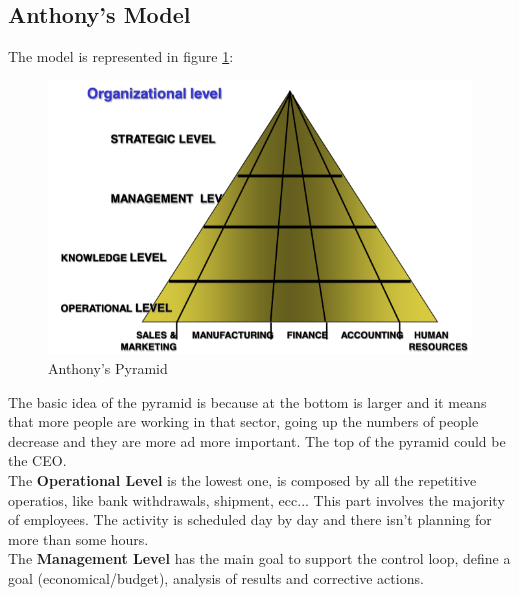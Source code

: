 \documentclass[12pt]{article}
\begin{document}
\subsection{Anthony's Model}
The model is represented in figure \ref{fig:anthony}:
\begin{figure}[H]
  \includegraphics[width=\linewidth]{images/anthony.png}
  \caption{Anthony's Pyramid}
  \label{fig:anthony}
\end{figure}
The basic idea of the pyramid is because at the bottom is larger and it means that more people are working in that sector, going up the numbers of people decrease and they are more ad more important. The top of the pyramid could be the CEO.\\
The \textbf{Operational Level} is the lowest one, is composed by all the repetitive operatios, like bank withdrawals, shipment, ecc... This part involves the majority of employees. The activity is scheduled day by day and there isn't planning for more than some hours.\\
The \textbf{Management Level} has the main goal to support the control loop, define a goal (economical/budget), analysis of results and corrective actions.
\end{document}
